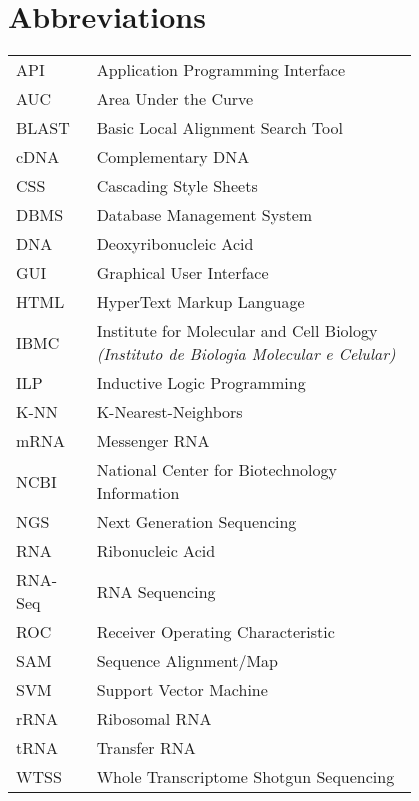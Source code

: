 \chapter*{Abbreviations}

\begin{flushleft}
\begin{tabular}{l p{0.8\linewidth}}
API       & Application Programming Interface\\
AUC       & Area Under the Curve\\
BLAST     & Basic Local Alignment Search Tool\\
cDNA      & Complementary DNA\\
CSS       & Cascading Style Sheets\\
DBMS      & Database Management System\\
DNA       & Deoxyribonucleic Acid\\
GUI       & Graphical User Interface\\
HTML      & HyperText Markup Language\\
IBMC      & Institute for Molecular and Cell Biology \textit{(Instituto de Biologia Molecular e Celular)}\\
ILP       & Inductive Logic Programming\\
K-NN      & K-Nearest-Neighbors\\
mRNA      & Messenger RNA\\
NCBI      & National Center for Biotechnology Information\\
NGS       & Next Generation Sequencing\\
RNA       & Ribonucleic Acid\\
RNA-Seq   & RNA Sequencing\\
ROC       & Receiver Operating Characteristic\\
SAM       & Sequence Alignment/Map\\
SVM       & Support Vector Machine\\
rRNA      & Ribosomal RNA\\
tRNA      & Transfer RNA\\
WTSS      & Whole Transcriptome Shotgun Sequencing\\
\end{tabular}
\end{flushleft}

